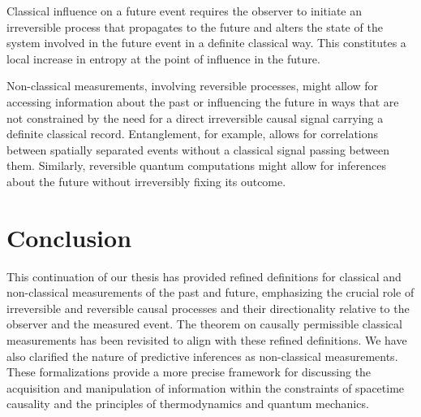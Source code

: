 	\begin{observation}
		Classical influence on a future event requires the observer to initiate an irreversible process that propagates to the future and alters the state of the system involved in the future event in a definite classical way. This constitutes a local increase in entropy at the point of influence in the future.
	\end{observation}
	
	\begin{observation}
		Non-classical measurements, involving reversible processes, might allow for accessing information about the past or influencing the future in ways that are not constrained by the need for a direct irreversible causal signal carrying a definite classical record. Entanglement, for example, allows for correlations between spatially separated events without a classical signal passing between them. Similarly, reversible quantum computations might allow for inferences about the future without irreversibly fixing its outcome.
	\end{observation}
	
	\section{Conclusion}
	
	This continuation of our thesis has provided refined definitions for classical and non-classical measurements of the past and future, emphasizing the crucial role of irreversible and reversible causal processes and their directionality relative to the observer and the measured event. The theorem on causally permissible classical measurements has been revisited to align with these refined definitions. We have also clarified the nature of predictive inferences as non-classical measurements. These formalizations provide a more precise framework for discussing the acquisition and manipulation of information within the constraints of spacetime causality and the principles of thermodynamics and quantum mechanics.
	
